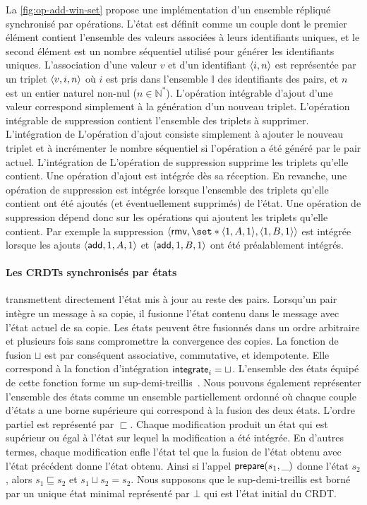 La \autoref{fig:op-add-win-set} propose une implémentation d'un ensemble répliqué synchronisé par opérations.
L'état est définit comme un couple dont le premier élément contient l'ensemble des valeurs associées à leurs identifiants uniques, et le second élément est un nombre séquentiel utilisé pour générer les identifiants uniques.
L'association d'une valeur $v$ et d'un identifiant $\tuple*{i, n}$ est représentée par un triplet $\tuple*{v, i, n}$ où $i$ est pris dans l'ensemble $\mathbb{I}$ des identifiants des pairs, et $n$ est un entier naturel non-nul ($n \in \mathbb{N}^*$).
L'opération intégrable d'ajout d'une valeur correspond simplement à la génération d'un nouveau triplet.
L'opération intégrable de suppression contient l'ensemble des triplets à supprimer.
L'intégration de L'opération d'ajout consiste simplement à ajouter le nouveau triplet et à incrémenter le nombre séquentiel si l'opération a été généré par le pair actuel.
L'intégration de L'opération de suppression supprime les triplets qu'elle contient.
Une opération d'ajout est intégrée dès sa réception.
En revanche, une opération de suppression est intégrée lorsque l'ensemble des triplets qu'elle contient ont été ajoutés (et éventuellement supprimés) de l'état.
Une opération de suppression dépend donc sur les opérations qui ajoutent les triplets qu'elle contient.
Par exemple la suppression $\tuple*{\trm{rmv}, \set*{\tuple*{1, A, 1}, \tuple*{1, B, 1}}}$ est intégrée lorsque les ajouts $\tuple*{\trm{add}, 1, A, 1}$ et $\tuple*{\trm{add}, 1, B, 1}$ ont été préalablement intégrés.


\paragraph{Les \acp{CRDT} synchronisés par états} transmettent directement l'état mis à jour au reste des pairs.
Lorsqu'un pair intègre un message à sa copie, il fusionne l'état contenu dans le message avec l'état actuel de sa copie.
Les états peuvent être fusionnés dans un ordre arbitraire et plusieurs fois sans compromettre la convergence des copies.
La fonction de fusion $\sqcup$ est par conséquent associative, commutative, et idempotente.
Elle correspond à la fonction d'intégration $\trm{integrate}_i = \sqcup$.
L'ensemble des états équipé de cette fonction forme un sup-demi-treillis~\autocite{davey2002lattice}.
Nous pouvons également représenter l'ensemble des états comme un ensemble partiellement ordonné où chaque couple d'états a une borne supérieure qui correspond à la fusion des deux états.
L'ordre partiel est représenté par $\sqsubset$.
Chaque modification produit un état qui est supérieur ou égal à l'état sur lequel la modification a été intégrée.
En d'autres termes, chaque modification enfle l'état tel que la fusion de l'état obtenu avec l'état précédent donne l'état obtenu.
Ainsi si l'appel $\trm{prepare}(s_1, \_)$ donne l'état $s_2$, alors $s_1 \sqsubseteq s_2$ et $s_1 \sqcup s_2 = s_2$.
Nous supposons que le sup-demi-treillis est borné par un unique état minimal représenté par $\bot$ qui est l'état initial du \ac{CRDT}.


